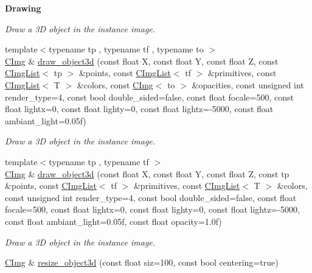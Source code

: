 \begin{Indent}{\bf Drawing}
\begin{DoxyCompactItemize}
\begin{DoxyCompactList}\small\item\em Draw a 3D object in the instance image. \item\end{DoxyCompactList}\item 
\hypertarget{structcimg__library_1_1_c_img_a061ba5d23e45b7b4330842cecb72b54f}{
{\footnotesize template$<$typename tp , typename tf , typename to $>$ }\\\hyperlink{structcimg__library_1_1_c_img}{CImg} \& \hyperlink{structcimg__library_1_1_c_img_a061ba5d23e45b7b4330842cecb72b54f}{draw\_\-object3d} (const float X, const float Y, const float Z, const \hyperlink{structcimg__library_1_1_c_img_list}{CImgList}$<$ tp $>$ \&points, const \hyperlink{structcimg__library_1_1_c_img_list}{CImgList}$<$ tf $>$ \&primitives, const \hyperlink{structcimg__library_1_1_c_img_list}{CImgList}$<$ T $>$ \&colors, const \hyperlink{structcimg__library_1_1_c_img}{CImg}$<$ to $>$ \&opacities, const unsigned int render\_\-type=4, const bool double\_\-sided=false, const float focale=500, const float lightx=0, const float lighty=0, const float lightz=-\/5000, const float ambiant\_\-light=0.05f)}
\label{structcimg__library_1_1_c_img_a061ba5d23e45b7b4330842cecb72b54f}

\begin{DoxyCompactList}\small\item\em Draw a 3D object in the instance image. \item\end{DoxyCompactList}\item 
\hypertarget{structcimg__library_1_1_c_img_a02b69a94aea6bf45fee2771a2ea229e0}{
{\footnotesize template$<$typename tp , typename tf $>$ }\\\hyperlink{structcimg__library_1_1_c_img}{CImg} \& \hyperlink{structcimg__library_1_1_c_img_a02b69a94aea6bf45fee2771a2ea229e0}{draw\_\-object3d} (const float X, const float Y, const float Z, const tp \&points, const \hyperlink{structcimg__library_1_1_c_img_list}{CImgList}$<$ tf $>$ \&primitives, const \hyperlink{structcimg__library_1_1_c_img_list}{CImgList}$<$ T $>$ \&colors, const unsigned int render\_\-type=4, const bool double\_\-sided=false, const float focale=500, const float lightx=0, const float lighty=0, const float lightz=-\/5000, const float ambiant\_\-light=0.05f, const float opacity=1.0f)}
\label{structcimg__library_1_1_c_img_a02b69a94aea6bf45fee2771a2ea229e0}

\begin{DoxyCompactList}\small\item\em Draw a 3D object in the instance image. \item\end{DoxyCompactList}\item 
\hypertarget{structcimg__library_1_1_c_img_a5f5f57589f123beed048d681bb7269e2}{
\hyperlink{structcimg__library_1_1_c_img}{CImg} \& \hyperlink{structcimg__library_1_1_c_img_a5f5f57589f123beed048d681bb7269e2}{resize\_\-object3d} (const float siz=100, const bool centering=true)}
\label{structcimg__library_1_1_c_img_a5f5f57589f123beed048d681bb7269e2}


\end{DoxyCompactItemize}
\end{Indent}
